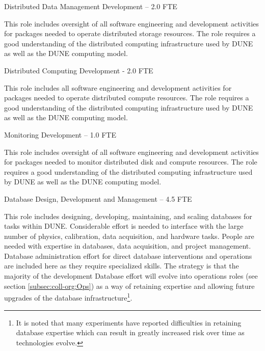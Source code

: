 \documentclass[../main-v1.tex]{subfiles}
\begin{document}
\begin{description}



\item {Distributed Data Management Development -- 2.0 FTE}

This role includes oversight of all software engineering and development activities for packages needed to operate distributed storage resources. The role requires a good understanding of the distributed computing infrastructure used by DUNE as well as the DUNE computing model.

\item {Distributed Computing Development -  2.0 FTE}

This role includes all software engineering and development activities for packages needed to operate  distributed compute resources. The role requires a good understanding of the distributed computing infrastructure used by DUNE as well as the DUNE computing model.

\item {Monitoring Development -- 1.0 FTE}

This role includes oversight of all software engineering and development activities for packages needed to monitor distributed disk and compute resources. The role requires a good understanding of the distributed computing infrastructure used by DUNE as well as the DUNE computing model.

\item {Database Design, Development and Management -- 4.5 FTE}

This role includes designing, developing, maintaining, and scaling databases for  
tasks within DUNE. Considerable effort is needed to interface with the large number of physics, calibration, data acquisition, and hardware tasks. People are needed with expertise in databases, data acquisition, and project management.  Database administration effort for direct database interventions and operations are included here as they require specialized skills. The strategy is that the majority of the development Database effort will evolve into operations roles (see section \ref{subsec:coll-org:Ops}) as a way of retaining expertise and allowing future upgrades of the database infrastructure\footnote{It is noted that many experiments have reported difficulties in retaining database expertise which can result in greatly increased risk over time as technologies evolve.}.


\end{description}
\end{document}
